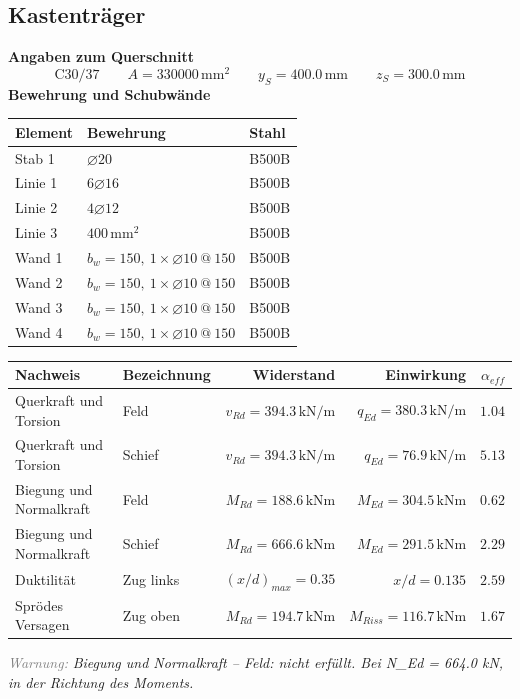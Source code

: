 \documentclass[11pt,a4paper]{article}
\newcommand{\hinweis}[2]{\par\noindent\textcolor{gray}{\textit{#1:}} \textit{#2}\par}
\begin{document}
\subsection{Kastenträger}
\noindent\textbf{Angaben zum Querschnitt}
\begin{equation*}
\text{C30/37} \qquad A = 330000\,\mathrm{mm}^2 \qquad y_S = 400.0\,\mathrm{mm} \qquad z_S = 300.0\,\mathrm{mm}
\end{equation*}
\noindent\textbf{Bewehrung und Schubwände}
\begin{longtable}{lll}
\hline
Element & Bewehrung & Stahl \\
\hline
\endhead
Stab 1 & $\varnothing 20$ & B500B \\
Linie 1 & $6 \varnothing 16$ & B500B \\
Linie 2 & $4 \varnothing 12$ & B500B \\
Linie 3 & $400\,\mathrm{mm}^2$ & B500B \\
Wand 1 & $b_w = 150,\ 1 \times \varnothing 10\ @\ 150$ & B500B \\
Wand 2 & $b_w = 150,\ 1 \times \varnothing 10\ @\ 150$ & B500B \\
Wand 3 & $b_w = 150,\ 1 \times \varnothing 10\ @\ 150$ & B500B \\
Wand 4 & $b_w = 150,\ 1 \times \varnothing 10\ @\ 150$ & B500B \\
\hline
\end{longtable}
\begin{xltabular}{\linewidth}{>{\raggedright\arraybackslash}X>{\raggedright\arraybackslash}Xrrr}
\hline
Nachweis & Bezeichnung & Widerstand & Einwirkung & $\alpha_{eff}$ \\
\hline
\endhead
Querkraft und Torsion & Feld & $v_{Rd} = 394.3\,\mathrm{kN}/\mathrm{m}$ & $q_{Ed} = 380.3\,\mathrm{kN}/\mathrm{m}$ & $1.04$ \\
Querkraft und Torsion & Schief & $v_{Rd} = 394.3\,\mathrm{kN}/\mathrm{m}$ & $q_{Ed} = 76.9\,\mathrm{kN}/\mathrm{m}$ & $5.13$ \\
Biegung und Normalkraft & Feld & $M_{Rd} = 188.6\,\mathrm{kNm}$ & $M_{Ed} = 304.5\,\mathrm{kNm}$ & $0.62$ \\
Biegung und Normalkraft & Schief & $M_{Rd} = 666.6\,\mathrm{kNm}$ & $M_{Ed} = 291.5\,\mathrm{kNm}$ & $2.29$ \\
Duktilität & Zug links & $\left(x/d\right)_{max} = 0.35$ & $x/d = 0.135$ & $2.59$ \\
Sprödes Versagen & Zug oben & $M_{Rd} = 194.7\,\mathrm{kNm}$ & $M_{Riss} = 116.7\,\mathrm{kNm}$ & $1.67$ \\
\hline
\end{xltabular}
\hinweis{Warnung}{Biegung und Normalkraft – Feld: nicht erfüllt. Bei N\_Ed = 664.0 kN, in der Richtung des Moments.}
\end{document}
